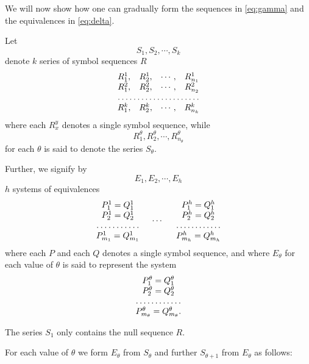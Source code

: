 \bigskip

We will now show how one can gradually form the sequences in
\eqref{eq:gamma} and the equivalences in \eqref{eq:delta}.

Let 
$$S_1, S_2, \cdots, S_k$$
denote $k$ series of symbol sequences $R$
$$\begin{array}{cccc}
R_1^1, & R_2^1, & \cdots, & R_{n_1}^1\\
R_1^2, & R_2^2, & \cdots, & R_{n_2}^2\\
\hdotsfor{4} \\
R_1^k, & R_2^k, & \cdots, & R_{n_k}^k\\
\end{array}$$
where each $R_x^y$ denotes a single symbol sequence, while
$$R_1^\theta,  R_2^\theta,  \cdots,  R_{n_\theta}^\theta$$
for each $\theta$ is said to denote the series $S_\theta$.


Further, we signify by
$$E_1, E_2, \cdots, E_h$$
$h$ systems of equivalences
$$\begin{array}{ccc}
\begin{array}{c}
P^1_1 = Q^1_1\\
P^1_2 = Q^1_2\\
\hdotsfor{1} \\
P^1_{m_1} = Q^1_{m_1}
\end{array}
&
\cdots
&
\begin{array}{c}
P^h_1 = Q^h_1 \\
P^h_2 = Q^h_2 \\
\hdotsfor{1} \\
P^h_{m_h} = Q^h_{m_h} 
\end{array}
\end{array}$$
where each $P$ and each $Q$ denotes a single symbol sequence, and where
$E_\theta$ for each value of $\theta$ is said to represent the system
\begin{gather*}
\begin{array}{c}
P_1^\theta = Q_1^\theta\\
P_2^\theta = Q_2^\theta\\
\hdotsfor{1} \\
P_{m_\theta}^\theta = Q_{m_\theta}^\theta.\\
\end{array}
\end{gather*}


\bigskip

The series $S_1$ only contains the null sequence $R$.

For each value of $\theta$ we form $E_\theta$ from $S_\theta$ and
further $S_{\theta+1}$ from $E_\theta$ as follows:

